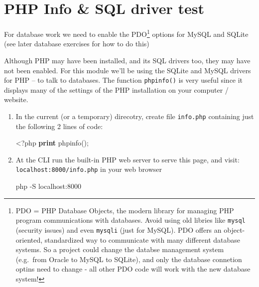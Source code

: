 \documentclass[a4paperpaper,openright]{book}
\newenvironment{Shaded}{}{}
\newcommand{\ExtensionTok}[1]{#1}
\newcommand{\FunctionTok}[1]{\textcolor[rgb]{0.02,0.16,0.49}{#1}}
\newcommand{\KeywordTok}[1]{\textcolor[rgb]{0.00,0.44,0.13}{\textbf{#1}}}
\newcommand{\NormalTok}[1]{#1}
\newcommand{\OtherTok}[1]{\textcolor[rgb]{0.00,0.44,0.13}{#1}}
\begin{document}
\hypertarget{php-info-sql-driver-test}{%
\section{PHP Info \& SQL driver test}\label{php-info-sql-driver-test}}

For database work we need to enable the PDO\footnote{PDO = PHP Database
  Objects, the modern library for managing PHP program communications
  with databases. Avoid using old libries like \texttt{mysql} (security
  issues) and even \texttt{mysqli} (just for MySQL). PDO offers an
  object-oriented, standardized way to communicate with many different
  database systems. So a project could change the databse management
  system (e.g.~from Oracle to MySQL to SQLite), and only the database
  connetion optins need to change - all other PDO code will work with
  the new database system!} options for MySQL and SQLite (see later
database exercises for how to do this)

Although PHP may have been installed, and its SQL drivers too, they may
have not been enabled. For this module we'll be using the SQLite and
MySQL drivers for PHP -- to talk to databases. The function
\texttt{phpinfo()} is very useful since it displays many of the settings
of the PHP installation on your computer / website.

\begin{enumerate}
\def\labelenumi{\arabic{enumi}.}
\item
  In the current (or a temporary) direcotry, create file
  \texttt{info.php} containing just the following 2 lines of code:

\begin{Shaded}
\begin{Highlighting}[]
\NormalTok{    <}\OtherTok{?}\NormalTok{php}
    \KeywordTok{print} \FunctionTok{phpinfo}\OtherTok{();}
\end{Highlighting}
\end{Shaded}
\item
  At the CLI run the built-in PHP web server to serve this page, and
  visit: \texttt{localhost:8000/info.php} in your web browser

\begin{Shaded}
\begin{Highlighting}[]
    \ExtensionTok{php}\NormalTok{ -S localhost:8000}
\end{Highlighting}
\end{Shaded}
\end{enumerate}
\end{document}
